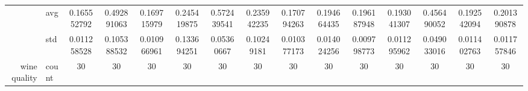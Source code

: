 \begin{table}[htbp]
{\begin{tabular}{rlccc|c|c|c|c|c|ccccc}
			                                                                               & avg                & \cellcolor[rgb]{ .388,  .745,  .482}\textcolor[rgb]{ 0,  .38,  0}{0.165552792} & \cellcolor[rgb]{ .98,  .522,  .443}0.492891063                                 & \cellcolor[rgb]{ .471,  .769,  .486}0.169715979                                & \cellcolor[rgb]{ 1,  .855,  .506}0.245419875    & \cellcolor[rgb]{ .973,  .412,  .42}0.572439541                                 & \cellcolor[rgb]{ 1,  .871,  .51}0.235942235     & \cellcolor[rgb]{ .49,  .773,  .486}0.170794263                                 & \cellcolor[rgb]{ .969,  .91,  .514}0.194664435  & \cellcolor[rgb]{ 1,  .922,  .518}0.196187948    & \cellcolor[rgb]{ .933,  .902,  .514}0.193041307 & \cellcolor[rgb]{ .984,  .573,  .451}0.456490052 & \cellcolor[rgb]{ .925,  .898,  .51}0.192542094  & \cellcolor[rgb]{ 1,  .918,  .518}0.201390878    \\
			                                                                               & std                & 0.011258528                                                                    & 0.105388532                                                                    & 0.010966961                                                                    & 0.133694251                                     & 0.05360667                                                                     & 0.10249181                                      & 0.010377173                                                                    & 0.014024256                                     & 0.009798773                                     & 0.011295962                                     & 0.049033016                                     & 0.011402763                                     & 0.011757846                                     \\
			wine quality                                                                   & count              & 30                                                                             & 30                                                                             & 30                                                                             & 30                                              & 30                                                                             & 30                                              & 30                                                                             & 30                                              & 30                                              & 30                                              & 30                                              & 30                                              & 30                                              \\

\end{tabular}}
\end{table}
